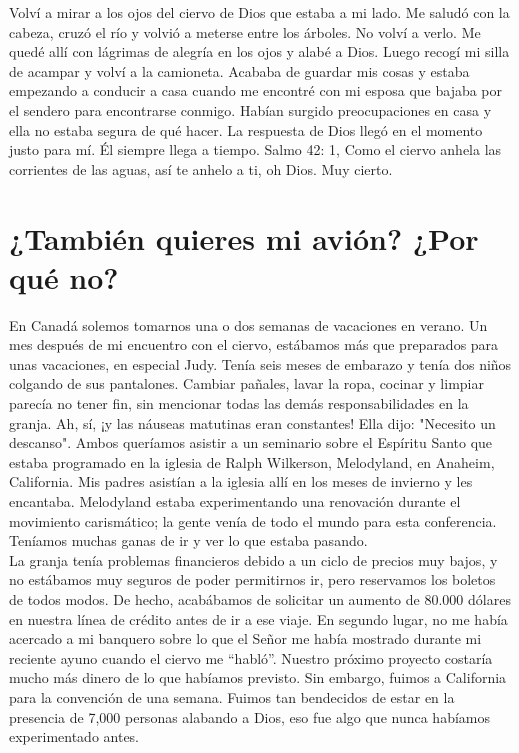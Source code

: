 \documentclass[twoside, 12pt]{book}
\begin{document}
Volví a mirar a los ojos del ciervo de Dios que estaba a mi lado. Me saludó con la cabeza, cruzó el río y volvió a meterse entre los árboles. No volví a verlo. Me quedé allí con lágrimas de alegría en los ojos y alabé a Dios. Luego recogí mi silla de acampar y volví a la camioneta. Acababa de guardar mis cosas y estaba empezando a conducir a casa cuando me encontré con mi esposa que bajaba por el sendero para encontrarse conmigo. Habían surgido preocupaciones en casa y ella no estaba segura de qué hacer. La respuesta de Dios llegó en el momento justo para mí. Él siempre llega a tiempo. Salmo 42: 1, Como el ciervo anhela las corrientes de las aguas, así te anhelo a ti, oh Dios. Muy cierto.\\

\section{¿También quieres mi avión? ¿Por qué no?}
 
 
 
 
 
 
 
 
 
 
En Canadá solemos tomarnos una o dos semanas de vacaciones en verano. Un mes después de mi encuentro con el ciervo, estábamos más que preparados para unas vacaciones, en especial Judy. Tenía seis meses de embarazo y tenía dos niños colgando de sus pantalones. Cambiar pañales, lavar la ropa, cocinar y limpiar parecía no tener fin, sin mencionar todas las demás responsabilidades en la granja. Ah, sí, ¡y las náuseas matutinas eran constantes! Ella dijo: "Necesito un descanso". Ambos queríamos asistir a un seminario sobre el Espíritu Santo que estaba programado en la iglesia de Ralph Wilkerson, Melodyland, en Anaheim, California. Mis padres asistían a la iglesia allí en los meses de invierno y les encantaba. Melodyland estaba experimentando una renovación durante el movimiento carismático; la gente venía de todo el mundo para esta conferencia. Teníamos muchas ganas de ir y ver lo que estaba pasando.\\

La granja tenía problemas financieros debido a un ciclo de precios muy bajos, y no estábamos muy seguros de poder permitirnos ir, pero reservamos los boletos de todos modos. De hecho, acabábamos de solicitar un aumento de 80.000 dólares en nuestra línea de crédito antes de ir a ese viaje. En segundo lugar, no me había acercado a mi banquero sobre lo que el Señor me había mostrado durante mi reciente ayuno cuando el ciervo me “habló”. Nuestro próximo proyecto costaría mucho más dinero de lo que habíamos previsto. Sin embargo, fuimos a California para la convención de una semana. Fuimos tan bendecidos de estar en la presencia de 7,000 personas alabando a Dios, eso fue algo que nunca habíamos experimentado antes.\\
\end{document}
